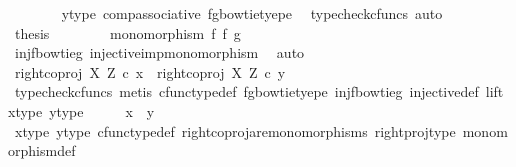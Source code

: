 \begin{isabellebody}
\ \ \ \ \ \ \isamarkupfalse%
\ y{\isacharunderscore}{\kern0pt}type{}\ comp{\isacharunderscore}{\kern0pt}associative{}\ fg{\isacharunderscore}{\kern0pt}bowtie{\isacharunderscore}{\kern0pt}tyepe\ \isamarkupfalse%
\ {\isacharparenleft}{\kern0pt}typecheck{\isacharunderscore}{\kern0pt}cfuncs{\isacharcomma}{\kern0pt}\ auto{\isacharparenright}{\kern0pt}\isanewline
\ \ \ \ \isamarkupfalse%
\ \isamarkupfalse%
\ {\isacharquery}{\kern0pt}thesis\isacommand{{\isachardot}{\kern0pt}}\isamarkupfalse%
\isanewline
\ \ \isamarkupfalse%
\isanewline
\ \ \isamarkupfalse%
\ \isamarkupfalse%
\ {\isachardoublequoteopen}monomorphism\ {\isacharparenleft}{\kern0pt}f\ {\isasymbowtie}\isactrlsub f\ g{\isacharparenright}{\kern0pt}{\isachardoublequoteclose}\isanewline
\ \ \ \ \isamarkupfalse%
\ inj{\isacharunderscore}{\kern0pt}f{\isacharunderscore}{\kern0pt}bowtie{\isacharunderscore}{\kern0pt}g\ injective{\isacharunderscore}{\kern0pt}imp{\isacharunderscore}{\kern0pt}monomorphism\ \isamarkupfalse%
\ auto\isanewline
\ \ \isamarkupfalse%
\ \isamarkupfalse%
\ {\isachardoublequoteopen}right{\isacharunderscore}{\kern0pt}coproj\ X\ Z\ {\isasymcirc}\isactrlsub c\ x\ {\isacharequal}{\kern0pt}\ right{\isacharunderscore}{\kern0pt}coproj\ X\ Z\ {\isasymcirc}\isactrlsub c\ y{\isachardoublequoteclose}\isanewline
\ \ \ \ \isamarkupfalse%
\ {\isacharparenleft}{\kern0pt}typecheck{\isacharunderscore}{\kern0pt}cfuncs{\isacharcomma}{\kern0pt}\ metis\ cfunc{\isacharunderscore}{\kern0pt}type{\isacharunderscore}{\kern0pt}def\ fg{\isacharunderscore}{\kern0pt}bowtie{\isacharunderscore}{\kern0pt}tyepe\ inj{\isacharunderscore}{\kern0pt}f{\isacharunderscore}{\kern0pt}bowtie{\isacharunderscore}{\kern0pt}g\ injective{\isacharunderscore}{\kern0pt}def\ lift\ x{\isacharunderscore}{\kern0pt}type{}\ y{\isacharunderscore}{\kern0pt}type{}{\isacharparenright}{\kern0pt}\isanewline
\ \ \isamarkupfalse%
\ \isamarkupfalse%
\ {\isachardoublequoteopen}x\ {\isacharequal}{\kern0pt}\ y{\isachardoublequoteclose}\isanewline
\ \ \ \ \isamarkupfalse%
\ x{\isacharunderscore}{\kern0pt}type{}\ y{\isacharunderscore}{\kern0pt}type{}\ cfunc{\isacharunderscore}{\kern0pt}type{\isacharunderscore}{\kern0pt}def\ right{\isacharunderscore}{\kern0pt}coproj{\isacharunderscore}{\kern0pt}are{\isacharunderscore}{\kern0pt}monomorphisms\ right{\isacharunderscore}{\kern0pt}proj{\isacharunderscore}{\kern0pt}type\ monomorphism{\isacharunderscore}{\kern0pt}def\ \isamarkupfalse%

\end{isabellebody}
